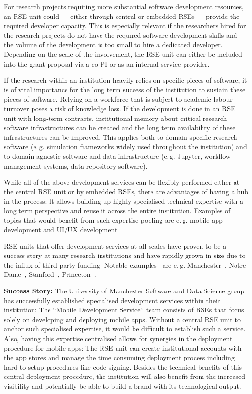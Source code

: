 \documentclass[a4paper]{article}
\makeatletter
\newcommand*{\eg}{e.\,g.\@\xspace}
\makeatother
\begin{document}
For research projects requiring more substantial software development resources, an RSE unit could --- either through central or embedded RSEs --- provide the required developer capacity.
This is especially relevant if the researchers hired for the research projects do not have the required software development skills and the volume of the development is too small to hire a dedicated developer.
Depending on the scale of the involvement, the RSE unit can either be included into the grant proposal via a co-PI or as an internal service provider.

If the research within an institution heavily relies on specific pieces of software,
it is of vital importance for the long term success of the institution to sustain these pieces of software.
Relying on a workforce that is subject to academic labour turnover poses a risk of knowledge loss.
If the development is done in an RSE unit with long-term contracts, institutional memory about critical research software infrastructures can be created and the long term availability of these infrastructures can be improved.
This applies both to domain-specific research software (\eg{} simulation frameworks widely used throughout the institution)
and to domain-agnostic software and data infrastructure (\eg{} Jupyter, workflow management systems, data repository software).

While all of the above development services can be flexibly performed either at the central RSE unit or by embedded RSEs, there are advantages of having a hub in the process:
It allows building up highly specialised technical expertise with a long term perspective and reuse it across the entire institution.
Examples of topics that would benefit from such expertise pooling are \eg{} mobile app development and UI/UX development.

RSE units that offer development services at all scales have proven to be a success story at many research institutions and have rapidly grown in size due to the influx of third party funding.
Notable examples~\autocite{Katz2019} are \eg{} Manchester~\autocite{Sinclair2022}, Notre-Dame~\autocite{NotreDame2025}, Stanford~\autocite{Stanford2025}, Princeton~\autocite{Princeton2025, Cosden2022a}.

\begin{mdframed}
\textbf{Success Story:} The University of Manchester Software and Data Science group has successfully established specialised development services within their institution:
The “Mobile Development Service” \autocite{manchester_mobile} team consists of RSEs that focus solely on developing and deploying mobile apps.
Without a central RSE unit to anchor such specialised expertise, it would be difficult to establish such a service.
Also, having this expertise centralised allows for synergies in the deployment procedure for mobile apps:
The RSE unit can create institutional accounts with the app stores and manage the time consuming deployment process including hard-to-setup procedures like code signing.
Besides the technical benefits of this central deployment procedure, the institution will also benefit from the increased visibility and potentially be able to build a brand with its technological output.
\end{mdframed}
\end{document}
